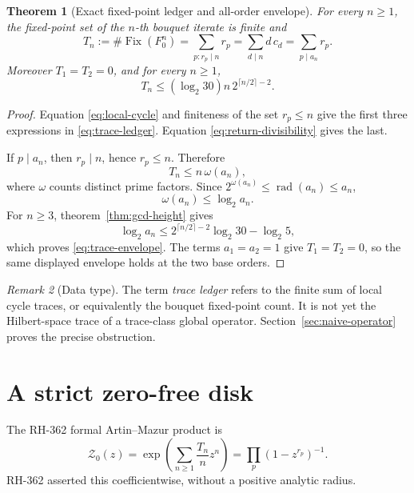 \documentclass[11pt]{article}
\numberwithin{equation}{section}
\newtheorem{theorem}{Theorem}[section]
\theoremstyle{remark}
\newtheorem{remark}[theorem]{Remark}
\newcommand{\Fix}{\operatorname{Fix}}
\newcommand{\rad}{\operatorname{rad}}
\newcommand{\cZ}{\mathcal Z}
\begin{document}
\begin{theorem}[Exact fixed-point ledger and all-order envelope]
\label{thm:trace-envelope}
For every \(n\ge1\), the fixed-point set of the \(n\)-th bouquet iterate is
finite and
\begin{equation}
 T_n:=\#\Fix(F_0^n)
 =\sum_{p:r_p\mid n}r_p
 =\sum_{d\mid n}d\,c_d
 =\sum_{p\mid a_n}r_p.
 \label{eq:trace-ledger}
\end{equation}
Moreover \(T_1=T_2=0\), and for every \(n\ge1\),
\begin{equation}
 T_n\le
 (\log_2 30)n\,2^{\lceil n/2\rceil-2}.
 \label{eq:trace-envelope}
\end{equation}
\end{theorem}

\begin{proof}
Equation \eqref{eq:local-cycle} and finiteness of the set \(r_p\le n\) give
the first three expressions in \eqref{eq:trace-ledger}.  Equation
\eqref{eq:return-divisibility} gives the last.

If \(p\mid a_n\), then \(r_p\mid n\), hence \(r_p\le n\).  Therefore
\begin{equation}
 T_n\le n\,\omega(a_n),
 \label{eq:T-omega}
\end{equation}
where \(\omega\) counts distinct prime factors.  Since
\(
2^{\omega(a_n)}\le\rad(a_n)\le a_n
\),
\begin{equation}
 \omega(a_n)\le\log_2a_n.
 \label{eq:omega-log}
\end{equation}
For \(n\ge3\), theorem~\ref{thm:gcd-height} gives
\[
 \log_2a_n
 \le2^{\lceil n/2\rceil-2}\log_2 30-\log_2 5,
\]
which proves \eqref{eq:trace-envelope}.  The terms \(a_1=a_2=1\) give
\(T_1=T_2=0\), so the same displayed envelope holds at the two base orders.
\end{proof}

\begin{remark}[Data type]
\label{rem:trace-data-type}
The term \emph{trace ledger} refers to the finite sum of local cycle traces,
or equivalently the bouquet fixed-point count.  It is not yet the
Hilbert-space trace of a trace-class global operator.
Section~\ref{sec:naive-operator} proves the precise obstruction.
\end{remark}

\section{A strict zero-free disk}

The RH-362 formal Artin--Mazur product is
\begin{equation}
 \cZ_0(z)
 =\exp\left(\sum_{n\ge1}\frac{T_n}{n}z^n\right)
 =\prod_p(1-z^{r_p})^{-1}.
 \label{eq:formal-zeta}
\end{equation}
RH-362 asserted this coefficientwise, without a positive analytic radius.
\end{document}

